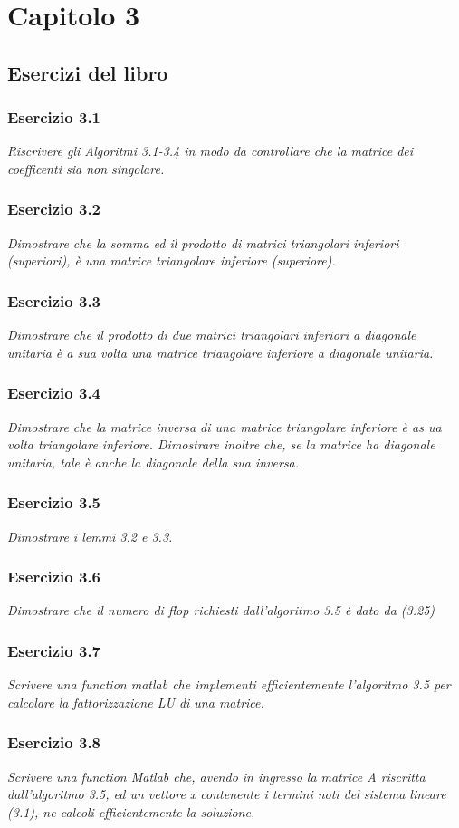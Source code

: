 \chapter{Capitolo 3}
\section{Esercizi del libro}
\subsection{Esercizio 3.1}
\emph{Riscrivere gli Algoritmi 3.1-3.4 in modo da controllare che la matrice dei coefficenti sia non singolare.}
\subsection{Esercizio 3.2}
\emph{Dimostrare che la somma ed il prodotto di matrici triangolari inferiori (superiori), è una matrice triangolare inferiore (superiore).}
\subsection{Esercizio 3.3}
\emph{Dimostrare che il prodotto di due matrici triangolari inferiori a diagonale unitaria è a sua volta una matrice triangolare inferiore a diagonale unitaria.}
\subsection{Esercizio 3.4}
\emph{Dimostrare che la matrice inversa di una matrice triangolare inferiore è as ua volta triangolare inferiore. Dimostrare inoltre che, se la matrice ha diagonale unitaria, tale è anche la diagonale della sua inversa.}
\subsection{Esercizio 3.5}
\emph{Dimostrare i lemmi 3.2 e 3.3.}
\subsection{Esercizio 3.6}
\emph{Dimostrare che il numero di flop richiesti dall'algoritmo 3.5 è dato da (3.25)}
\subsection{Esercizio 3.7}
\emph{Scrivere una function matlab che implementi efficientemente l'algoritmo 3.5 per calcolare la fattorizzazione LU di una matrice.}
\subsection{Esercizio 3.8}
\emph{Scrivere una function Matlab che, avendo in ingresso la matrice A riscritta dall'algoritmo 3.5, ed un vettore x contenente i termini noti del sistema lineare (3.1), ne calcoli efficientemente la soluzione.}

